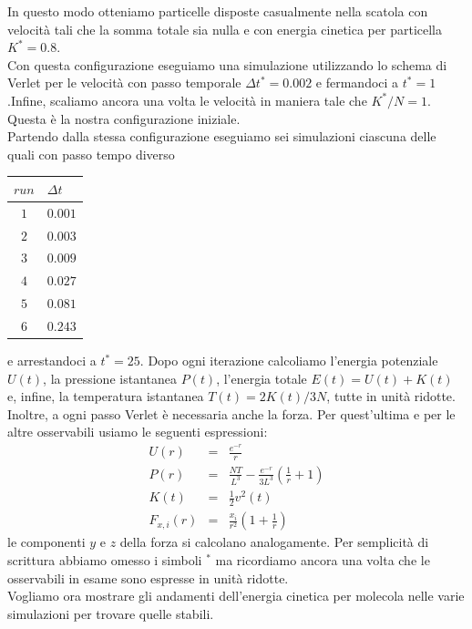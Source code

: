 \documentclass[a4paper,11pt]{article}
\begin{document}
In questo modo otteniamo particelle disposte casualmente nella scatola con velocità tali che la somma totale sia nulla e con energia cinetica per particella $K^* = 0.8$.\\
Con questa configurazione eseguiamo una simulazione utilizzando lo schema di Verlet per le velocità con passo temporale $\Delta t^* = 0.002$ e fermandoci a $t^* = 1$.Infine, scaliamo ancora una volta le velocità in maniera tale che $K^*/N = 1$. Questa è la nostra configurazione iniziale.
\\
\noindent Partendo dalla stessa configurazione eseguiamo sei simulazioni  ciascuna delle quali con passo tempo diverso
\begin{table}[H]
	\centering
	\begin{tabular}{cl} 
		\hline
		$run$	&	$\Delta t$ \\
		\hline
		$1$	&	$0.001$\\
		$2$	&	$0.003$	\\
		$3$	&	$0.009$	\\
		$4$	&	$0.027$	\\
		$5$	&	$0.081$	\\
		$6$	&	$0.243$	\\\hline
	\end{tabular}
\end{table}
\medskip
\noindent e arrestandoci a $t^* = 25$. Dopo ogni iterazione calcoliamo l'energia potenziale $U(t)$, la pressione istantanea $P(t)$, l'energia totale $E(t)=U(t)+K(t)$ e, infine, la temperatura istantanea $T(t)=2K(t)/3N$, tutte in unità ridotte. Inoltre, a ogni passo Verlet è necessaria anche la forza. Per quest'ultima e per le altre osservabili usiamo le seguenti espressioni:
\begin{eqnarray}
U(r) & = & \frac{e^{-r}}{r}\\
P(r) & = & \frac{NT}{L^{3}} - \frac{e^{-r}}{3L^{3}}\left(\frac{1}{r} + 1\right)\\
K(t) & = & \frac{1}{2}v^2(t)\\
F_{x,i}(r) & = & \frac{x_i}{r^2} \left(1+\frac{1}{r}\right)
\end{eqnarray}
le componenti $y$ e $z$ della forza si calcolano analogamente. Per semplicità di scrittura abbiamo omesso i simboli $^*$ ma ricordiamo ancora una volta che le osservabili in esame sono espresse in unità ridotte. \\Vogliamo ora mostrare gli andamenti dell'energia cinetica per molecola nelle varie simulazioni per trovare quelle stabili.
\end{document}
